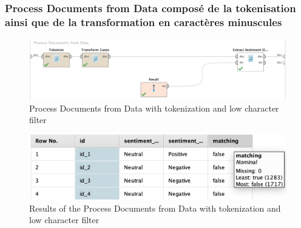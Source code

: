 \documentclass[a4paper]{article}
\begin{document}
\subsubsection{Process Documents from Data composé de la tokenisation ainsi que de la transformation en caractères minuscules}
\begin{figure}[H]
	\includegraphics[width=\linewidth]{imgs/part_3/3_processing_documents_no_stem_filter_token_stopword}
	\caption{Process Documents from Data with tokenization and low character filter}
	\label{fig:3_processing_documents_full}
\end{figure}
\begin{figure}[H]
	\includegraphics[width=\linewidth]{imgs/part_3/3_processing_documents_no_stem_filter_token_stopword_results}
	\caption{Results of the Process Documents from Data with tokenization and low character filter}
	\label{fig:3_processing_documents_no_stem_filter_token_stopword_results}
\end{figure}
\end{document}
